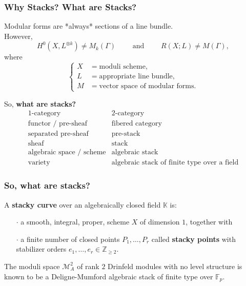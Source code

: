 \documentclass[handout]{beamer}
\numberwithin{equation}{section}
\numberwithin{case}{theorem}
\newcommand{\cM}{\mathcal{M}}		%
\newcommand{\bbF}{\mathbb{F}}		%
\newcommand{\bbK}{\mathbb{K}}		%
\newcommand{\bbZ}{\mathbb{Z}}		%
\newcommand{\<}{\left\langle}
\renewcommand{\>}{\right\rangle}
\begin{document}
	\begin{frame}
		\frametitle{Why Stacks? What are Stacks?}
		Modular forms are *always* sections of a line bundle.\\ \pause
		However, \[H^0(X,L^{\otimes k})\neq M_k(\Gamma)\quad\quad \text{ and }\quad\quad R(X;L)\neq M(\Gamma),\] 
		where
		\[\begin{cases}
			X &= \text{moduli scheme},\\ 
			L &= \text{appropriate line bundle},\\
			M &= \text{vector space of modular forms}.
		\end{cases}\] \pause
		
		So, \textbf{what are stacks?} \pause
		\[\begin{array}{c|c}
			1\text{-category}&2\text{-category}\\ 
			\hline
			\text{functor / pre-sheaf}&\text{fibered category}\\ 
			\text{separated pre-sheaf}&\text{pre-stack}\\ 
			\text{sheaf}&\text{stack}\\ 
			\text{algebraic space / scheme}&\text{algebraic stack}\\
			\text{variety}&\text{algebraic stack of finite type over a field}
		\end{array}\]
	\end{frame}
	
	\begin{frame}
		\frametitle{So, what are stacks?}
			\begin{definition}%
				A \textbf{stacky curve} over an algebraically closed field $\bbK$ is:
				\begin{itemize}
					\item[$\cdot$] a smooth, integral, proper, scheme $X$ of dimension $1$, together with\\ \pause
					\item[$\cdot$] a finite number of closed points $P_1,\ldots, P_r$ called \textbf{stacky points} with stabilizer orders $e_1,\ldots, e_r\in \bbZ_{\geq 2}.$
				\end{itemize}
			\end{definition}
			\pause
			\begin{example}
				The moduli space $\cM^2_A$ of rank $2$ Drinfeld modules with no level structure is known to be a Deligne-Mumford algebraic stack of finite type over $\bbF_p.$ 
			\end{example}
	\end{frame}	
	
\end{document}
